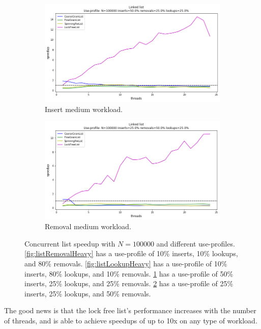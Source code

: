\documentclass[11pt]{article}
\begin{document}
\begin{figure}[h]
\\ %
\begin{subfigure}{.5\textwidth}
  \centering
  \includegraphics[width=.8\linewidth]{figs/lateday/combined/lateday_combined_list_insert_50_lookup_25_removal_25}
  \caption{Insert medium workload.}
  \label{fig:listInsertMedium}
\end{subfigure}%
\hspace*{\fill}
\begin{subfigure}{.5\textwidth}
  \centering
  \includegraphics[width=.8\linewidth]{figs/lateday/combined/lateday_combined_list_insert_25_lookup_25_removal_50}
  \caption{Removal medium workload.}
  \label{fig:listRemovalMedium}
\end{subfigure}
\caption{
Concurrent list speedup with $N=100000$ and different use-profiles.
\ref{fig:listRemovalHeavy} has a use-profile of 10\% inserts, 10\% lookups, and
80\% removals. \ref{fig:listLookupHeavy} has a use-profile of 10\% inserts, 80\%
lookups, and 10\% removals. \ref{fig:listInsertMedium} has a use-profile of 50\%
inserts, 25\% lookups, and 25\% removals. \ref{fig:listRemovalMedium} has a
use-profile of 25\% inserts, 25\% lookups, and 50\% removals.
}
\label{fig:manyLists}
\end{figure}

The good news is that the lock free list's performance increases with the number
of threads, and is able to achieve speedups of up to 10x on any type of workload.
\end{document}
